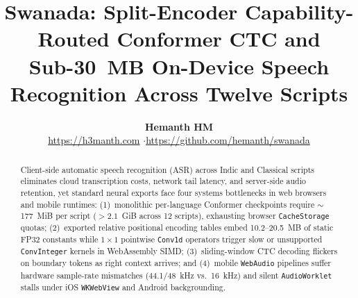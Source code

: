 \documentclass[10pt,twocolumn]{article}
\title{\vspace{-2.0em}\textbf{\large Swanada: Split-Encoder Capability-Routed Conformer CTC and\\Sub-30~MB On-Device Speech Recognition Across Twelve Scripts}\vspace{-0.8em}}
\author{
  \textbf{Hemanth HM} \\
  \small\url{https://h3manth.com} \quad$\cdot$\quad \url{https://github.com/hemanth/swanada}
}
\date{\vspace{-1.5em}}
\begin{document}
\maketitle

\begin{abstract}
Client-side automatic speech recognition (ASR) across Indic and Classical scripts eliminates cloud transcription costs, network tail latency, and server-side audio retention, yet standard neural exports face four systems bottlenecks in web browsers and mobile runtimes: (1)~monolithic per-language Conformer checkpoints require $\sim$177~MiB per script ($> 2.1$~GiB across 12 scripts), exhausting browser \texttt{CacheStorage} quotas; (2)~exported relative positional encoding tables embed 10.2--20.5~MB of static FP32 constants while $1\times 1$ pointwise \texttt{Conv1d} operators trigger slow or unsupported \texttt{ConvInteger} kernels in WebAssembly SIMD; (3)~sliding-window CTC decoding flickers on boundary tokens as right context arrives; and (4)~mobile \texttt{WebAudio} pipelines suffer hardware sample-rate mismatches (44.1/48~kHz vs.\ 16~kHz) and silent \texttt{AudioWorklet} stalls under iOS \texttt{WKWebView} and Android backgrounding.


\end{abstract}
\end{document}
